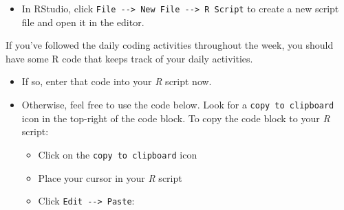\documentclass[
]{book}
\providecommand{\tightlist}{%
  \setlength{\itemsep}{0pt}\setlength{\parskip}{0pt}}
\begin{document}
\begin{itemize}
\tightlist
\item
  In RStudio, click \texttt{File\ -\/-\textgreater{}\ New\ File\ -\/-\textgreater{}\ R\ Script} to create a new script file and open it in the editor.
\end{itemize}

If you've followed the daily coding activities throughout the week, you should have some R code that keeps track of your daily activities.

\begin{itemize}
\item
  If so, enter that code into your \emph{R} script now.
\item
  Otherwise, feel free to use the code below. Look for a \texttt{copy\ to\ clipboard} icon in the top-right of the code block. To copy the code block to your \emph{R} script:

  \begin{itemize}
  \tightlist
  \item
    Click on the \texttt{copy\ to\ clipboard} icon
  \item
    Place your cursor in your \emph{R} script
  \item
    Click \texttt{Edit\ -\/-\textgreater{}\ Paste}:
  \end{itemize}
\end{itemize}
\end{document}
